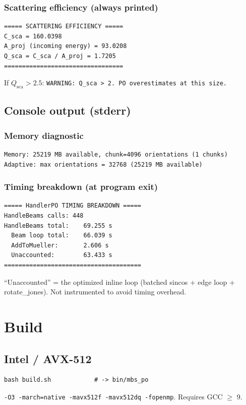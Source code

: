 \documentclass[11pt,a4paper]{article}
\begin{document}
\subsubsection{Scattering efficiency (always printed)}
\begin{lstlisting}[basicstyle=\ttfamily\scriptsize]
===== SCATTERING EFFICIENCY =====
C_sca = 160.0398
A_proj (incoming energy) = 93.0208
Q_sca = C_sca / A_proj = 1.7205
=================================
\end{lstlisting}

If $Q_\text{sca} > 2.5$: \texttt{WARNING: Q\_sca > 2. PO overestimates at this size.}

\subsection{Console output (stderr)}

\subsubsection{Memory diagnostic}
\begin{lstlisting}[basicstyle=\ttfamily\scriptsize]
Memory: 25219 MB available, chunk=4096 orientations (1 chunks)
Adaptive: max orientations = 32768 (25219 MB available)
\end{lstlisting}

\subsubsection{Timing breakdown (at program exit)}
\begin{lstlisting}[basicstyle=\ttfamily\scriptsize]
===== HandlerPO TIMING BREAKDOWN =====
HandleBeams calls: 448
HandleBeams total:    69.255 s
  Beam loop total:    66.039 s
  AddToMueller:       2.606 s
  Unaccounted:        63.433 s
======================================
\end{lstlisting}

``Unaccounted'' = the optimized inline loop (batched sincos + edge loop + rotate\_jones).
Not instrumented to avoid timing overhead.

\section{Build}

\subsection{Intel / AVX-512}
\begin{lstlisting}
bash build.sh            # -> bin/mbs_po
\end{lstlisting}
\texttt{-O3 -march=native -mavx512f -mavx512dq -fopenmp}. Requires GCC $\geq$ 9.
\end{document}
